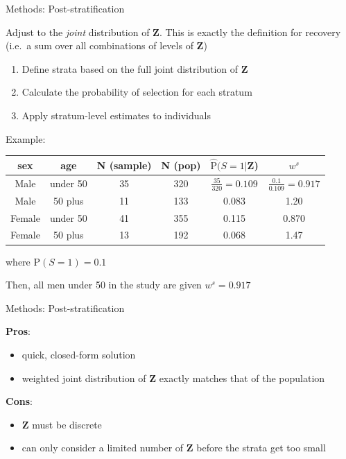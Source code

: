 \documentclass[
  ignorenonframetext,
]{beamer}
\providecommand{\tightlist}{%
  \setlength{\itemsep}{0pt}\setlength{\parskip}{0pt}}
\begin{document}
\begin{frame}{Methods: Post-stratification}
\protect\hypertarget{methods-post-stratification}{}

Adjust to the \emph{joint} distribution of \(\mathbf{Z}\). This is
exactly the definition for recovery (i.e.~a sum over all combinations of
levels of \(\mathbf{Z}\))

\begin{enumerate}
\tightlist
\item
  Define strata based on the full joint distribution of \(\mathbf{Z}\)
\item
  Calculate the probability of selection for each stratum
\item
  Apply stratum-level estimates to individuals
\end{enumerate}

Example:

\begin{table}[H]
\small
    \centering
    \begin{tabular}{|c c | c c |c | c|}
    \hline
    \textbf{sex} & \textbf{age} & \textbf{N (sample)} & \textbf{N (pop)} & $\hat{\text{P}}(S = 1 | \mathbf{Z}$) & $w^s$\\
    \hline
    Male & under 50 & 35 & 320 & $\frac{35}{320} = 0.109$ & $\frac{0.1}{0.109} = 0.917$\\
    Male & 50 plus & 11 & 133 & 0.083 & 1.20\\
    Female & under 50 & 41 & 355 & 0.115 & 0.870\\
    Female & 50 plus & 13 & 192 & 0.068 & 1.47\\
    \hline
    \end{tabular}
\end{table}

where \(\text{P}(S = 1) = 0.1\)

Then, all men under 50 in the study are given \(w^s = 0.917\)

\end{frame}

\begin{frame}{Methods: Post-stratification}
\protect\hypertarget{methods-post-stratification-1}{}

\textbf{Pros}:

\begin{itemize}
\tightlist
\item
  quick, closed-form solution
\item
  weighted joint distribution of \(\mathbf{Z}\) exactly matches that of
  the population
\end{itemize}

\textbf{Cons}:

\begin{itemize}
\tightlist
\item
  \(\mathbf{Z}\) must be discrete
\item
  can only consider a limited number of \(\mathbf{Z}\) before the strata
  get too small
\end{itemize}

\end{frame}
\end{document}
